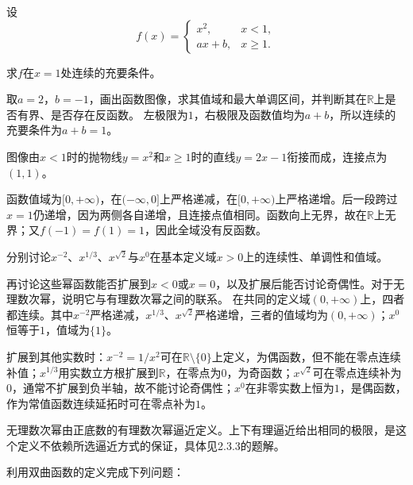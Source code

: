 设
\begin{equation*}
    f(x) = \begin{cases}
        x^{2} , & x < 1 , \\
        a x + b , & x \ge 1 .
    \end{cases}
\end{equation*}

\quad {}求\(f\)在\(x = 1\)处连续的充要条件。

\quad {}取\(a = 2\)，\(b = -1\)，画出函数图像，求其值域和最大单调区间，并判断其在\(\mathbb{R}\)上是否有界、是否存在反函数。
\solutionanswer
{}左极限为\(1\)，右极限及函数值均为\(a+b\)，所以连续的充要条件为\(a+b=1\)。

图像由\(x<1\)时的抛物线\(y=x^2\)和\(x\ge1\)时的直线\(y=2x-1\)衔接而成，连接点为\((1,1)\)。

函数值域为\([0,+\infty)\)，在\((-\infty,0]\)上严格递减，在\([0,+\infty)\)上严格递增。后一段跨过\(x=1\)仍递增，因为两侧各自递增，且连接点值相同。函数向上无界，故在\(\mathbb R\)上无界；又\(f(-1)=f(1)=1\)，因此全域没有反函数。


分别讨论\(x^{-2}\)、\(x^{1/3}\)、\(x^{\sqrt{2}}\)与\(x^{0}\)在基本定义域\(x > 0\)上的连续性、单调性和值域。

再讨论这些幂函数能否扩展到\(x < 0\)或\(x = 0\)，以及扩展后能否讨论奇偶性。对于无理数次幂，说明它与有理数次幂之间的联系。
\solutionanswer
在共同的定义域\((0,+\infty)\)上，四者都连续。其中\(x^{-2}\)严格递减，\(x^{1/3}\)、\(x^{\sqrt2}\)严格递增，三者的值域均为\((0,+\infty)\)；\(x^0\)恒等于\(1\)，值域为\(\{1\}\)。

扩展到其他实数时：\(x^{-2}=1/x^2\)可在\(\mathbb R\setminus\{0\}\)上定义，为偶函数，但不能在零点连续补值；\(x^{1/3}\)用实数立方根扩展到\(\mathbb R\)，在零点为\(0\)，为奇函数；\(x^{\sqrt2}\)可在零点连续补为\(0\)，通常不扩展到负半轴，故不能讨论奇偶性；\(x^0\)在非零实数上恒为\(1\)，是偶函数，作为常值函数连续延拓时可在零点补为\(1\)。

无理数次幂由正底数的有理数次幂逼近定义。上下有理逼近给出相同的极限，是这个定义不依赖所选逼近方式的保证，具体见2.3.3的题解。


利用双曲函数的定义完成下列问题：

